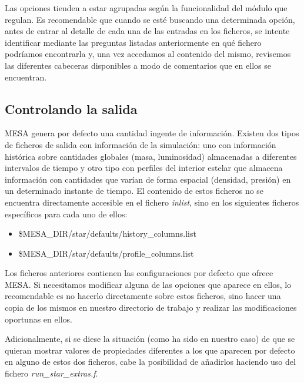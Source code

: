 Las opciones tienden a estar agrupadas según la funcionalidad del módulo que regulan. Es recomendable que cuando se esté buscando una determinada opción, antes de entrar al detalle de cada una de las entradas en los ficheros, se intente identificar mediante las preguntas listadas anteriormente en qué fichero podríamos encontrarla y, una vez accedamos al contenido del mismo, revisemos las diferentes cabeceras disponibles a modo de comentarios que en ellos se encuentran.\par

\subsection{Controlando la salida} \label{sec:ctrl_salida}
MESA genera por defecto una cantidad ingente de información. Existen dos tipos de ficheros de salida con información de la simulación: uno con información histórica sobre cantidades globales (masa, luminosidad) almacenadas a diferentes intervalos de tiempo y otro tipo con perfiles del interior estelar que almacena información con cantidades que varían de forma espacial (densidad, presión) en un determinado instante de tiempo. El contenido de estos ficheros no se encuentra directamente accesible en el fichero \textit{inlist}, sino en los siguientes ficheros específicos para cada uno de ellos:

\begin{itemize}
    \item \$MESA\_DIR/star/defaults/history\_columns.list
    \item \$MESA\_DIR/star/defaults/profile\_columns.list
\end{itemize}

Los ficheros anteriores contienen las configuraciones por defecto que ofrece MESA. Si necesitamos modificar alguna de las opciones que aparece en ellos, lo recomendable es no hacerlo directamente sobre estos ficheros, sino hacer una copia de los mismos en nuestro directorio de trabajo y realizar las modificaciones oportunas en ellos.\par

Adicionalmente, si se diese la situación (como ha sido en nuestro caso) de que se quieran mostrar valores de propiedades diferentes a los que aparecen por defecto en alguno de estos dos ficheros, cabe la posibilidad de añadirlos haciendo uso del fichero \textit{run\_star\_extras.f}.\par

